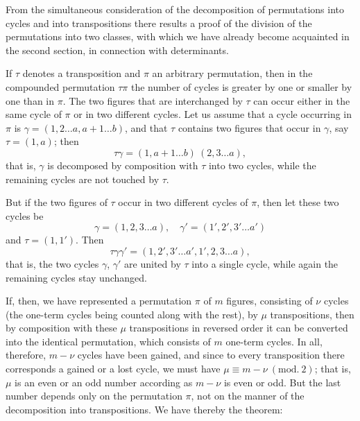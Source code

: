 
From the simultaneous consideration of the decomposition of permutations into cycles and into transpositions there results a proof of the division of the permutations into two classes, with which we have already become acquainted in the second section, in connection with determinants.

If $\tau$ denotes a transposition and $\pi$ an arbitrary permutation, then in the compounded permutation $\tau\pi$ the number of cycles is greater by one or smaller by one than in $\pi$. The two figures that are interchanged by $\tau$ can occur either in the same cycle of $\pi$ or in two different cycles. Let us assume that a cycle occurring in $\pi$ is $\gamma = (1, 2 \dots a, a + 1 \dots b)$, and that $\tau$ contains two figures that occur in $\gamma$, say $\tau = (1, a)$; then
\[
\tau\gamma = (1, a + 1 \dots b)\ (2, 3 \dots a),
\]
that is, $\gamma$ is decomposed by composition with $\tau$ into two cycles, while the remaining cycles are not touched by $\tau$.

But if the two figures of $\tau$ occur in two different cycles of $\pi$, then let these two cycles be
\[
\gamma = (1, 2, 3 \dots a), \quad \gamma' = (1', 2', 3' \dots a')
\]
and $\tau = (1, 1')$. Then
\[
\tau\gamma\gamma' = (1, 2', 3' \dots a', 1', 2, 3 \dots a),
\]
that is, the two cycles $\gamma$, $\gamma'$ are united by $\tau$ into a single cycle, while again the remaining cycles stay unchanged.

If, then, we have represented a permutation $\pi$ of $m$ figures, consisting of $\nu$ cycles (the one-term cycles being counted along with the rest), by $\mu$ transpositions, then by composition with these $\mu$ transpositions in reversed order it can be converted into the identical permutation, which consists of $m$ one-term cycles. In all, therefore, $m - \nu$ cycles have been gained, and since to every transposition there corresponds a gained or a lost cycle, we must have $\mu \equiv m - \nu\ (\mathrm{mod}.\ 2)$; that is, $\mu$ is an even or an odd number according as $m - \nu$ is even or odd. But the last number depends only on the permutation $\pi$, not on the manner of the decomposition into transpositions. We have thereby the theorem:
